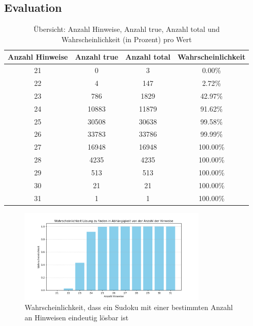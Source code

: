 \subsection{Evaluation}
\begin{table}[h!]
    \centering
    \begin{tabular}{|c|c|c|c|}
        \hline
        \textbf{Anzahl Hinweise} & \textbf{Anzahl true} & \textbf{Anzahl total} & \textbf{Wahrscheinlichkeit} \\
        \hline
        21 & 0     & 3     & 0.00\% \\
        22 & 4     & 147   & 2.72\% \\
        23 & 786   & 1829  & 42.97\% \\
        24 & 10883 & 11879 & 91.62\% \\
        25 & 30508 & 30638 & 99.58\% \\
        26 & 33783 & 33786 & 99.99\% \\
        27 & 16948 & 16948 & 100.00\% \\
        28 & 4235  & 4235  & 100.00\% \\
        29 & 513   & 513   & 100.00\% \\
        30 & 21    & 21    & 100.00\% \\
        31 & 1     & 1     & 100.00\% \\
        \hline
    \end{tabular}
    \caption{Übersicht: Anzahl Hinweise, Anzahl true, Anzahl total und Wahrscheinlichkeit (in Prozent) pro Wert}
\end{table}

\begin{figure}[h!]
    \centering
    \includegraphics[width=0.8\textwidth]{Pictures/wahrscheinlichkeiten}
    \caption{Wahrscheinlichkeit, dass ein Sudoku mit einer bestimmten Anzahl an Hinweisen eindeutig lösbar ist}
    \label{fig:wahrscheinlichkeiten}

\end{figure}

